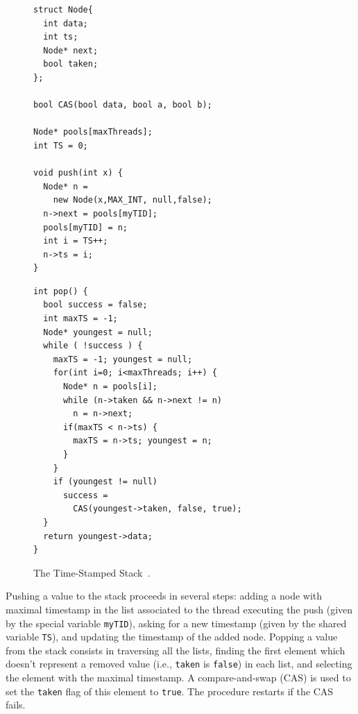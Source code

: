 \begin{figure}[t]
  \begin{minipage}[t]{0.49\linewidth}
    \begin{lstlisting}
struct Node{
  int data;
  int ts;
  Node* next;
  bool taken;
};

bool CAS(bool data, bool a, bool b);

Node* pools[maxThreads];
int TS = 0;

void push(int x) {
  Node* n =
    new Node(x,MAX_INT, null,false);
  n->next = pools[myTID];
  pools[myTID] = n;
  int i = TS++;
  n->ts = i;
}
    \end{lstlisting}
  \end{minipage}
  \hfill
  \begin{minipage}[t]{0.49\linewidth}
    \begin{lstlisting}
int pop() {
  bool success = false;
  int maxTS = -1;
  Node* youngest = null;
  while ( !success ) {
    maxTS = -1; youngest = null;
    for(int i=0; i<maxThreads; i++) {
      Node* n = pools[i];
      while (n->taken && n->next != n)
        n = n->next;
      if(maxTS < n->ts) {
        maxTS = n->ts; youngest = n;
      }
    }
    if (youngest != null)
      success =
        CAS(youngest->taken, false, true);
  }
  return youngest->data;
}
    \end{lstlisting}
  \end{minipage}

  \caption{The Time-Stamped Stack~\cite{DBLP:conf/popl/DoddsHK15}.}
  \label{fig:TimeStamped}
\end{figure}

Pushing a value to the stack proceeds in several steps: adding a node with maximal timestamp in the list associated to the thread executing the push (given by the special variable {\tt myTID}), asking for a new timestamp (given by the shared variable {\tt TS}), and updating the timestamp of the added node. Popping a value from the stack consists in traversing all the lists, finding the first element which doesn't represent a removed value (i.e., {\tt taken} is {\tt false}) in each list, and selecting the element with the maximal timestamp. A compare-and-swap (CAS) is used to set the {\tt taken} flag of this element to {\tt true}. The procedure restarts if the CAS fails.


